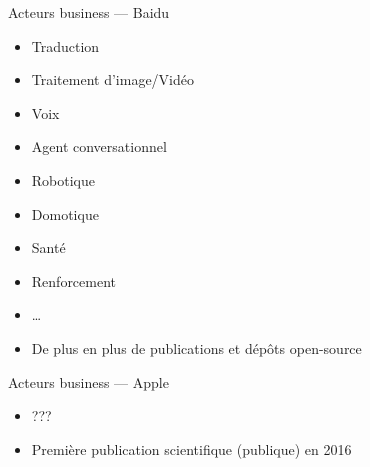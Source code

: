 \begin{frame}{Acteurs business --- Baidu}
  \begin{itemize}
  \item Traduction
  \item Traitement d'image/Vidéo
  \item Voix
  \item Agent conversationnel
  \item Robotique
  \item Domotique
  \item Santé
  \item Renforcement
  \item …
  \item De plus en plus de publications et dépôts open-source
  \end{itemize}
\end{frame}

\begin{frame}{Acteurs business --- Apple}
  \begin{itemize}
  \item ???
  \item Première publication scientifique (publique) en 2016
  \end{itemize}
\end{frame}
